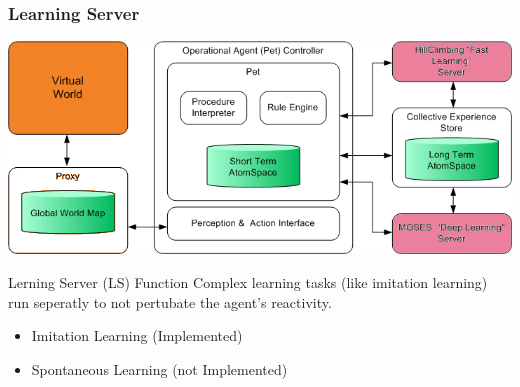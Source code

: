 \documentclass{beamer}
\begin{document}
\frame
{
  \frametitle{Learning Server}

  \begin{center}
    \includegraphics[scale=0.3]{EmbodimentSystemArchitecture_3.png}
  \end{center}

  \begin{beamerboxesrounded}{Lerning Server (LS) Function}
    Complex learning tasks (like imitation learning) run seperatly
    to not pertubate the agent's reactivity.
  \end{beamerboxesrounded}

  \begin{itemize}
  \item<+-> Imitation Learning (Implemented)
  \item<+-> Spontaneous Learning (not Implemented)
  \end{itemize}
}
\end{document}
